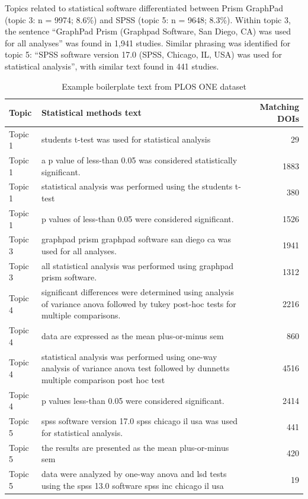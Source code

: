 \documentclass[12pt]{article}
\begin{document}
Topics related to statistical software differentiated between Prism
GraphPad (topic 3: n = 9974; 8.6\%) and SPSS (topic 5: n = 9648; 8.3\%).
Within topic 3, the sentence ``GraphPad Prism (Graphpad Software, San
Diego, CA) was used for all analyses'' was found in 1,941 studies.
Similar phrasing was identified for topic 5: ``SPSS software version
17.0 (SPSS, Chicago, IL, USA) was used for statistical analysis'', with
similar text found in 441 studies.

\begin{table}

\caption{\label{tab:unnamed-chunk-8}Example boilerplate text from PLOS ONE dataset}
\centering
\begin{tabular}[t]{l|l|r}
\hline
Topic & Statistical methods text & Matching DOIs\\
\hline
Topic 1 & students t-test was used for statistical analysis & 29\\
\hline
Topic 1 & a p value of less-than 0.05 was considered statistically significant. & 1883\\
\hline
Topic 1 & statistical analysis was performed using the students t-test & 380\\
\hline
Topic 1 & p values of less-than 0.05 were considered significant. & 1526\\
\hline
Topic 3 & graphpad prism graphpad software san diego ca was used for all analyses. & 1941\\
\hline
Topic 3 & all statistical analysis was performed using graphpad prism software. & 1312\\
\hline
Topic 4 & significant differences were determined using analysis of variance anova followed by tukey post-hoc tests for multiple comparisons. & 2216\\
\hline
Topic 4 & data are expressed as the mean plus-or-minus sem & 860\\
\hline
Topic 4 & statistical analysis was performed using one-way analysis of variance anova test followed by dunnetts multiple comparison post hoc test & 4516\\
\hline
Topic 4 & p values less-than 0.05 were considered significant. & 2414\\
\hline
Topic 5 & spss software version 17.0 spss chicago il usa was used for statistical analysis. & 441\\
\hline
Topic 5 & the results are presented as the mean plus-or-minus sem & 420\\
\hline
Topic 5 & data were analyzed by one-way anova and lsd tests using the spss 13.0 software spss inc chicago il usa & 19\\

\end{tabular}
\end{table}
\end{document}
